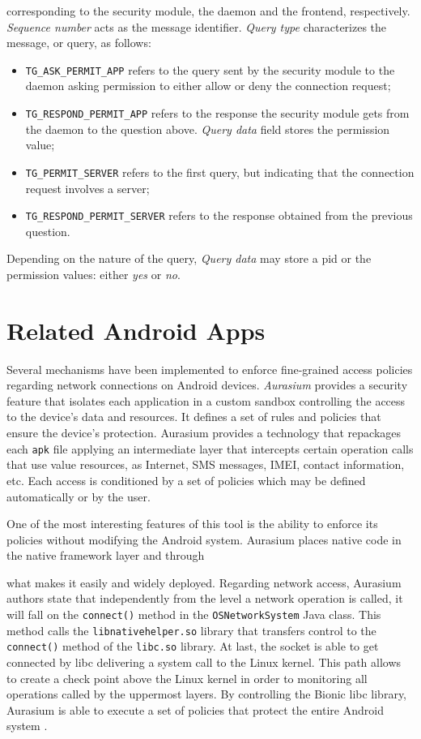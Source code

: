 corresponding to the security module, the daemon and the frontend, respectively. \textit{Sequence number} acts as the message identifier. \textit{Query type} characterizes the message, or query, as follows:

\begin{itemize}
\item \texttt{TG\_ASK\_PERMIT\_APP} refers to the query sent by the security module to the daemon asking permission to either allow or deny the connection request;
\item \texttt{TG\_RESPOND\_PERMIT\_APP} refers to the response the security module gets from the daemon to the question above. \textit{Query data} field stores the permission value;
\item \texttt{TG\_PERMIT\_SERVER} refers to the first query, but indicating that the connection request involves a server;
\item \texttt{TG\_RESPOND\_PERMIT\_SERVER} refers to the response obtained from the previous question.
\end{itemize}

Depending on the nature of the query, \textit{Query data} may store a \gls{pid} or the permission values: either \textit{yes} or \textit{no}. 

\section{Related Android Apps}


Several mechanisms have been implemented to enforce fine-grained access policies regarding network connections on Android devices. \textit{Aurasium} provides a security feature that isolates each application in a custom sandbox controlling the access to the device's data and resources. It defines a set of rules and policies that ensure the device's protection. Aurasium provides a technology that repackages each \texttt{apk} file applying an intermediate layer that intercepts certain operation calls that use value resources, as Internet, SMS messages, IMEI, contact information, etc. Each access is conditioned by a set of policies which may be defined automatically or by the user. 

One of the most interesting features of this tool is the ability to enforce its policies without modifying the Android system. Aurasium places native code in the native framework layer and through 

 what makes it easily and widely deployed. Regarding network access, Aurasium authors state that independently from the level a network operation is called, it will fall on the \texttt{connect()} method in the \texttt{OSNetworkSystem} Java class. This method calls the \texttt{libnativehelper.so} library that transfers control to the \texttt{connect()} method of the \texttt{libc.so} library. At last, the socket is able to get connected by libc delivering a system call to the Linux kernel. This path allows to create a check point above the Linux kernel in order to monitoring all operations called by the uppermost layers. By controlling the Bionic libc library, Aurasium is able to execute a set of policies that protect the entire Android system \cite{Aurasium}.


